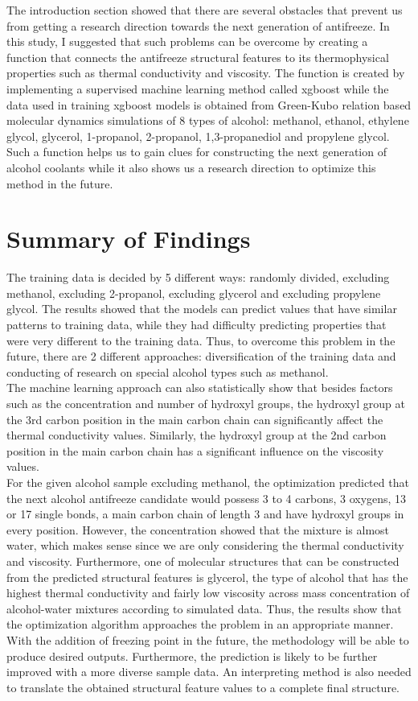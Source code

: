 The introduction section showed that there are several obstacles that 
prevent us from getting a research direction towards the next generation 
of antifreeze. In this study, I suggested that such problems can be overcome 
by creating a function that connects the antifreeze structural features to 
its thermophysical properties such as thermal conductivity and viscosity. 
The function is created by implementing a supervised machine learning method 
called xgboost while the data used in training xgboost models is obtained 
from Green-Kubo relation based molecular dynamics simulations of 8 types of 
alcohol: methanol, ethanol, ethylene glycol, glycerol, 1-propanol, 2-propanol, 
1,3-propanediol and propylene glycol. Such a function helps us to gain clues 
for constructing the next generation of alcohol coolants while it also shows 
us a research direction to optimize this method in the future.
\section*{Summary of Findings}
The training data is decided by 5 different ways: randomly divided, 
excluding methanol, excluding 2-propanol, excluding glycerol and excluding 
propylene glycol. The results showed that the models can predict values that 
have similar patterns to training data, while they had difficulty predicting 
properties that were very different to the training data. Thus, to overcome 
this problem in the future, there are 2 different approaches: diversification 
of the training data and conducting of research on special alcohol types such 
as methanol.\\
The machine learning approach can also statistically show that besides factors 
such as the concentration and number of hydroxyl groups, the hydroxyl group at 
the 3rd carbon position in the main carbon chain can significantly affect the 
thermal conductivity values. Similarly, the hydroxyl group at the 2nd carbon 
position in the main carbon chain has a significant influence on the viscosity 
values.\\
For the given alcohol sample excluding methanol, the optimization predicted 
that the next alcohol antifreeze candidate would possess 3 to 4 carbons, 3 
oxygens, 13 or 17 single bonds, a main carbon chain of length 3 and have 
hydroxyl groups in every position. However, the concentration showed that 
the mixture is almost water, which makes sense since we are only considering 
the thermal conductivity and viscosity. Furthermore, one of molecular 
structures that can be constructed from the predicted structural features is 
glycerol, the type of alcohol that has the highest thermal conductivity and 
fairly low viscosity across mass concentration of alcohol-water mixtures 
according to simulated data. Thus, the results show that the optimization 
algorithm approaches the problem in an appropriate manner. With the addition 
of freezing point in the future, the methodology will be able to produce 
desired outputs. 
Furthermore, the prediction is likely to be further improved with a more 
diverse sample data. An interpreting method is also needed to translate the 
obtained structural feature values to a complete final structure.
